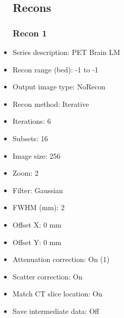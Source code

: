 \documentclass[12pt]{article}
\begin{document}
\begin{itemize}[noitemsep]
\subsection{Recons}
\subsubsection{Recon 1}
\item Series description: PET Brain LM
\item Recon range (bed): -1 to -1
\item Output image type: NoRecon
\item Recon method: Iterative
\item Iterations: 6
\item Subsets: 16
\item Image size: 256
\item Zoom: 2
\item Filter: Gaussian
\item FWHM (mm): 2
\item Offset X: 0 mm
\item Offset Y: 0 mm
\item Attenuation correction: On (1)
\item Scatter correction: On
\item Match CT slice location: On
\item Save intermediate data: Off
\end{itemize}
\end{document}
